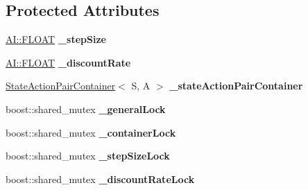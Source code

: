 \subsection*{Protected Attributes}
\begin{DoxyCompactItemize}
\item 
\hypertarget{classAI_1_1Algorithm_1_1ReinforcementLearning_ae8a4204e547054e55542e6f7de4b5dc1}{\hyperlink{namespaceAI_a41b74884a20833db653dded3918e05c3}{A\+I\+::\+F\+L\+O\+A\+T} {\bfseries \+\_\+step\+Size}}\label{classAI_1_1Algorithm_1_1ReinforcementLearning_ae8a4204e547054e55542e6f7de4b5dc1}

\item 
\hypertarget{classAI_1_1Algorithm_1_1ReinforcementLearning_af72ecd83332f502a73f9c5636f433de2}{\hyperlink{namespaceAI_a41b74884a20833db653dded3918e05c3}{A\+I\+::\+F\+L\+O\+A\+T} {\bfseries \+\_\+discount\+Rate}}\label{classAI_1_1Algorithm_1_1ReinforcementLearning_af72ecd83332f502a73f9c5636f433de2}

\item 
\hypertarget{classAI_1_1Algorithm_1_1ReinforcementLearning_aee3318af6590363309fdd04fb9eeebe5}{\hyperlink{classAI_1_1StateActionPairContainer}{State\+Action\+Pair\+Container}$<$ S, A $>$ {\bfseries \+\_\+state\+Action\+Pair\+Container}}\label{classAI_1_1Algorithm_1_1ReinforcementLearning_aee3318af6590363309fdd04fb9eeebe5}

\item 
\hypertarget{classAI_1_1Algorithm_1_1ReinforcementLearning_aa6cddd34af5d8565ea71796434dc17af}{boost\+::shared\+\_\+mutex {\bfseries \+\_\+general\+Lock}}\label{classAI_1_1Algorithm_1_1ReinforcementLearning_aa6cddd34af5d8565ea71796434dc17af}

\item 
\hypertarget{classAI_1_1Algorithm_1_1ReinforcementLearning_a365513e575cf60c0ae6fd5dfcfc54913}{boost\+::shared\+\_\+mutex {\bfseries \+\_\+container\+Lock}}\label{classAI_1_1Algorithm_1_1ReinforcementLearning_a365513e575cf60c0ae6fd5dfcfc54913}

\item 
\hypertarget{classAI_1_1Algorithm_1_1ReinforcementLearning_acc5503fcb31fb030be0c9d302517adcc}{boost\+::shared\+\_\+mutex {\bfseries \+\_\+step\+Size\+Lock}}\label{classAI_1_1Algorithm_1_1ReinforcementLearning_acc5503fcb31fb030be0c9d302517adcc}

\item 
\hypertarget{classAI_1_1Algorithm_1_1ReinforcementLearning_aaa369f14f7f9b9ddb0bf8efb2b8363dd}{boost\+::shared\+\_\+mutex {\bfseries \+\_\+discount\+Rate\+Lock}}\label{classAI_1_1Algorithm_1_1ReinforcementLearning_aaa369f14f7f9b9ddb0bf8efb2b8363dd}

\end{DoxyCompactItemize}
